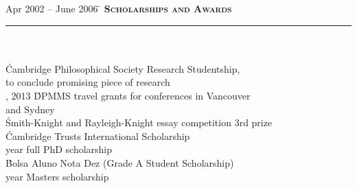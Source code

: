 \documentclass[11pt,a4paper]{article}
\begin{document}
\begin{tabbing} 
 Apr 2002 -- June 2006 \=\kill
\> \textbf{\Large{\textsc{Scholarships and Awards}}} \\
\> \noindent\rule{11cm}{1pt}\\
\> \\
 \' Cambridge Philosophical Society Research Studentship, \\ \> to conclude promising piece of research \\ [1mm]
, 2013 \' DPMMS travel grants for conferences in Vancouver \\ \>  and Sydney \\ [1mm]
 \' Smith-Knight and Rayleigh-Knight essay competition 3rd prize \\ [1mm]
 \' Cambridge Trusts International Scholarship \\  year full PhD scholarship \\ [1mm]
 \' Bolsa Aluno Nota Dez (Grade A Student Scholarship) \\  year Masters scholarship \\
\end{tabbing}
\end{document}
